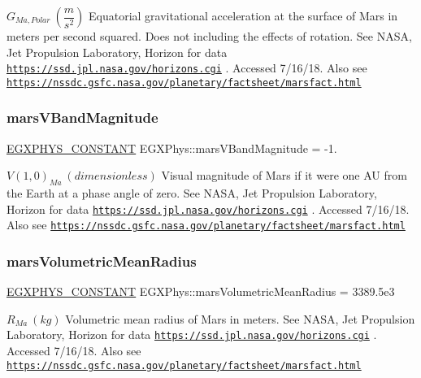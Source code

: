 $ G_{Ma,Polar} \ (\dfrac{m}{s^2})$ Equatorial gravitational acceleration at the surface of Mars in meters per second squared. Does not including the effects of rotation. See N\+A\+SA, Jet Propulsion Laboratory, Horizon for data \href{https://ssd.jpl.nasa.gov/horizons.cgi}{\tt https\+://ssd.\+jpl.\+nasa.\+gov/horizons.\+cgi} . Accessed 7/16/18. Also see \href{https://nssdc.gsfc.nasa.gov/planetary/factsheet/marsfact.html}{\tt https\+://nssdc.\+gsfc.\+nasa.\+gov/planetary/factsheet/marsfact.\+html} \mbox{\label{group___e_g_x_phys-_constants-_astrophysics-_solar_system-_mars-_bulk_ga42329bb55497fce9d36f086206e21b10}} 
\subsubsection{\texorpdfstring{mars\+V\+Band\+Magnitude}{marsVBandMagnitude}}
{\footnotesize\ttfamily \mbox{\hyperlink{group___e_g_x_phys-_constants-_macros_ga76980d288494ce1714c9ac68a95ba702}{E\+G\+X\+P\+H\+Y\+S\+\_\+\+C\+O\+N\+S\+T\+A\+NT}} E\+G\+X\+Phys\+::mars\+V\+Band\+Magnitude = -\/1.}

$ V(1,0)_{Ma} \ (dimensionless)$ Visual magnitude of Mars if it were one AU from the Earth at a phase angle of zero. See N\+A\+SA, Jet Propulsion Laboratory, Horizon for data \href{https://ssd.jpl.nasa.gov/horizons.cgi}{\tt https\+://ssd.\+jpl.\+nasa.\+gov/horizons.\+cgi} . Accessed 7/16/18. Also see \href{https://nssdc.gsfc.nasa.gov/planetary/factsheet/marsfact.html}{\tt https\+://nssdc.\+gsfc.\+nasa.\+gov/planetary/factsheet/marsfact.\+html} \mbox{\label{group___e_g_x_phys-_constants-_astrophysics-_solar_system-_mars-_bulk_ga89463b1a65363c3f458c8427a3d5ca90}} 
\subsubsection{\texorpdfstring{mars\+Volumetric\+Mean\+Radius}{marsVolumetricMeanRadius}}
{\footnotesize\ttfamily \mbox{\hyperlink{group___e_g_x_phys-_constants-_macros_ga76980d288494ce1714c9ac68a95ba702}{E\+G\+X\+P\+H\+Y\+S\+\_\+\+C\+O\+N\+S\+T\+A\+NT}} E\+G\+X\+Phys\+::mars\+Volumetric\+Mean\+Radius = 3389.\+5e3}

$R_{Ma} \ (kg)$ Volumetric mean radius of Mars in meters. See N\+A\+SA, Jet Propulsion Laboratory, Horizon for data \href{https://ssd.jpl.nasa.gov/horizons.cgi}{\tt https\+://ssd.\+jpl.\+nasa.\+gov/horizons.\+cgi} . Accessed 7/16/18. Also see \href{https://nssdc.gsfc.nasa.gov/planetary/factsheet/marsfact.html}{\tt https\+://nssdc.\+gsfc.\+nasa.\+gov/planetary/factsheet/marsfact.\+html} 